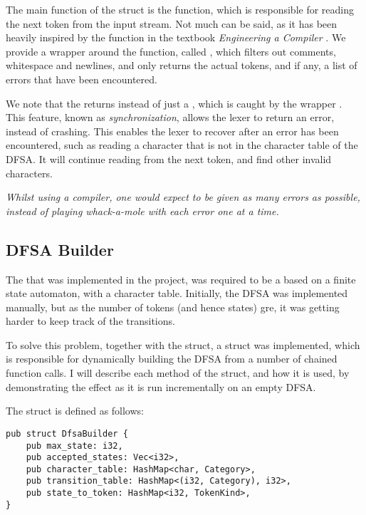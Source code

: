 The main function of the  struct is the  function,
which is responsible for reading the next token from the input stream. Not much
can be said, as it has been heavily inspired by the  function
in the textbook \textit{Engineering a Compiler} \cite{engineering-a-compiler}.
We provide a wrapper around the  function, called
, which filters out comments, whitespace and newlines, and only
returns the actual tokens, and if any, a list of errors that have been
encountered.


We note that the  returns 
instead of just a , which is caught by the wrapper .
This feature, known as \textit{synchronization}, allows the lexer to return an
error, instead of crashing. This enables the lexer to recover after an error has
been encountered, such as reading a character that is not in the character table
of the DFSA. It will continue reading from the next token, and find other
invalid characters.

\begin{center}
    \textit{Whilst using a compiler, one would expect to
        be given as many errors as possible, instead of
        playing whack-a-mole with each error one at a time.}
\end{center}

\newpage

\subsection{DFSA Builder}

The  that was implemented in the project, was required to
be a based on a finite state automaton, with a character table. Initially, the
DFSA was implemented manually, but as the number of tokens (and hence states)
gre, it was getting harder to keep track of the transitions.

To solve this problem, together with the  struct, a
 struct was implemented, which is responsible for dynamically
building the DFSA from a number of chained function calls. I will describe each
method of the  struct, and how it is used, by demonstrating
the effect as it is run incrementally on an empty DFSA.


The  struct is defined as follows:

\begin{mainbox}{}
    \lstset{xleftmargin=0cm}
    \begin{lstlisting}
pub struct DfsaBuilder {
    pub max_state: i32,
    pub accepted_states: Vec<i32>,
    pub character_table: HashMap<char, Category>,
    pub transition_table: HashMap<(i32, Category), i32>,
    pub state_to_token: HashMap<i32, TokenKind>,
}
    \end{lstlisting}
\end{mainbox}

